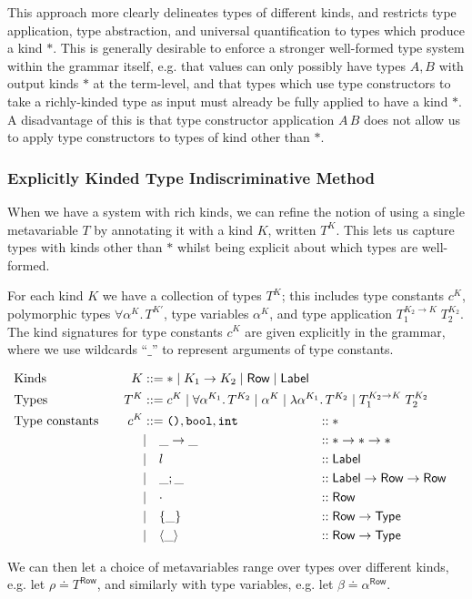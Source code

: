 \documentclass[acmsmall, 9pt]{article}
\begin{document}
\lbreak
This approach more clearly delineates types of different kinds, and restricts type application, type abstraction, and universal quantification to types which produce a kind $*$. This is generally desirable to enforce a stronger well-formed type system within the grammar itself, e.g. that values can only possibly have types $A, B$ with output kinds $*$ at the term-level, and that types which use type constructors to take a richly-kinded type as input must already be fully applied to have a kind $*$. A disadvantage of this is that type constructor application $A\,B$ does not allow us to apply type constructors to types of kind other than $*$.

\subsubsection{\textbullet \; Explicitly Kinded Type Indiscriminative Method \cite{leijen2005extensible}}
When we have a system with rich kinds, we can refine the notion of using a single metavariable $T$ by annotating it with a kind $K$, written $T^K$. This lets us capture types with kinds other than $*$ whilst being explicit about which types are well-formed.

\lbreak
For each kind $K$ we have a collection of types $T^K$; this includes type constants $c^K$, polymorphic types $\forall \alpha^K . \, T^{K'}$, type variables $\alpha^K$, and type application $T_1^{K_2 \rightarrow K} \; T_2^{K_2}$. The kind signatures for type constants $c^K$ are given explicitly in the grammar, where we use wildcards ``$\_$'' to represent arguments of type constants.

\begin{align*}
  &\text{Kinds} \quad &K &::= * \; | \; K_1 \rightarrow K_2 \; | \; \mathsf{Row} \; | \; \mathsf{Label} \\
  &\text{Types} \quad &T^K &::= c^K \; | \; \forall \alpha^{K_1} . \, T^{K_2}\; | \; \alpha^K \; | \; \lambda \alpha^{K_1}. \, T^{K_2} \; |  \; T_1^{K_2 \rightarrow K} \; T_2^{K_2} \span\span\\
  &\text{Type constants} \quad &c^K &::= \texttt{()}, \texttt{bool}, \texttt{int} &::& \; *\\
  &&&| \quad \_ \rightarrow \_ &::& \; * \rightarrow * \rightarrow * \\
  &&&| \quad l &::& \; \mathsf{Label} \\
  &&&| \quad \_ ; \_ &::& \; \mathsf{Label} \rightarrow \mathsf{Row} \rightarrow \mathsf{Row}\\
  &&&| \quad \cdot &::& \; \mathsf{Row}\\
  &&&| \quad \tyBrace{\_} &::& \; \mathsf{Row} \rightarrow \mathsf{Type}\\
  &&&| \quad \tyAngle{\_} &::& \; \mathsf{Row} \rightarrow \mathsf{Type}\\
\end{align*}

\noindent
We can then let a choice of metavariables range over types over different kinds, e.g. let $\rho \doteq T^{\mathsf{Row}}$, and similarly with type variables, e.g. let $\beta \doteq \alpha^{\mathsf{Row}}$.
\printbibliography
\end{document}
